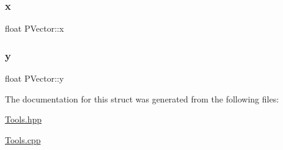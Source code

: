 \subsubsection{\texorpdfstring{x}{x}}
{\footnotesize\ttfamily float P\+Vector\+::x}

\hypertarget{struct_p_vector_a63d91c43b923e9e63f1fb1e0598b5962}{}\label{struct_p_vector_a63d91c43b923e9e63f1fb1e0598b5962} 
\subsubsection{\texorpdfstring{y}{y}}
{\footnotesize\ttfamily float P\+Vector\+::y}



The documentation for this struct was generated from the following files\+:\begin{DoxyCompactItemize}
\item 
\hyperlink{_tools_8hpp}{Tools.\+hpp}\item 
\hyperlink{_tools_8cpp}{Tools.\+cpp}\end{DoxyCompactItemize}
